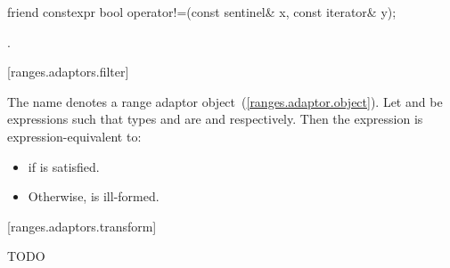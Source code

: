 %
\begin{itemdecl}
friend constexpr bool operator!=(const sentinel& x, const iterator& y);
\end{itemdecl}

\begin{itemdescr}
\pnum
\returns {}.
\end{itemdescr}


[ranges.adaptors.filter]{}

\pnum
The name  denotes a range adaptor
object~(\ref{ranges.adaptor.object}). Let  and  be expressions such
that types  and  are  and 
respectively. Then the expression  is expression-equivalent to:

\begin{itemize}
\item {} if
is satisfied.
\item Otherwise,  is ill-formed.
\end{itemize}

[ranges.adaptors.transform]{}

TODO
